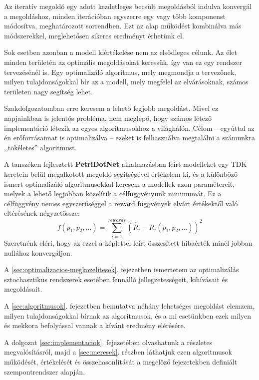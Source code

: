 Az iteratív megoldó egy adott kezdetleges becsült megoldásból indulva konvergál a megoldáshoz, minden iterációban egyszerre egy vagy több komponenst módosítva, meghatározott sorrendben. Ezt az alap működést kombinálva más módszerekkel, meglehetősen sikeres eredményt érhetünk el.\cite{SolverKonyv}

Sok esetben azonban a modell kiértékelése nem az elsődleges célunk. Az élet minden területén az optimális megoldásokat keressük, így van ez egy rendszer tervezésénél is. Egy optimalizáló algoritmus, mely megmondja a tervezőnek, milyen tulajdonságokkal bír az a modell, mely megfelel az elvárásoknak, számos területen nagy segítség lehet.

Szakdolgozatomban erre keresem a lehető legjobb megoldást. Mivel ez napjainkban is jelentős probléma, nem meglepő, hogy számos létező implementáció létezik az egyes algoritmusokhoz a világhálón. Célom -- egyúttal az én erőforrásaimat is optimalizálva -- ezeket is felhasználva megtalálni a számunkra ,,tökéletes'' algoritmust.

A tanszéken fejlesztett \textbf{PetriDotNet} alkalmazásban leírt modelleket egy TDK keretein belül megalkotott megoldó\cite{SpdnTDK} segítségével értékelem ki, és a különböző ismert optimalizáló algoritmusokkal keresem a modellek azon paramétereit, melyek a lehető legjobban közelítik a célfüggvényünk minimumát. Ez a célfüggvény nemes egyszerűséggel a reward függvények elvárt értékektől való eltérésének négyzetössze:
\begin{equation}
	\label{eq:celfgv}
	f(p_1,p_2,...)=\sum_{i=1}^{rewards}\left( \hat{R}_i-R_i(p_1,p_2,...)\right) ^2
\end{equation}
Szeretnénk eléri, hogy az ezzel a képlettel leírt összesített hibaérték minél jobban nullához konvergáljon.

A \ref{sec:optimalizacios-megkozelitesek}. fejezetben ismertetem az optimalizálás sztochasztikus rendszerek esetében fennálló jellegzetességeit, kihívásait és megoldásait.

A \ref{sec:algoritmusok}. fejezetben bemutatva néhány lehetséges megoldást elemzem, milyen tulajdonságokkal bírnak az algoritmusok, és a mi esetünkben ezek milyen és mekkora befolyással vannak a kívánt eredmény elérésére.

A dolgozat \ref{sec:implementaciok}. fejezetében olvashatunk a részletes megvalósításról, majd a \ref{sec:meresek}. részben láthatjuk ezen algoritmusok működését, értékelését és összehasonlítását a megelőző fejezetekben definiált szempontrendszer alapján.